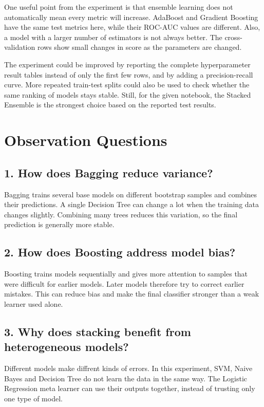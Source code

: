 \documentclass[12pt,a4paper]{article}
\begin{document}
One useful point from the experiment is that ensemble learning does not automatically mean every metric will increase. AdaBoost and Gradient Boosting have the same test metrics here, while their ROC-AUC values are different. Also, a model with a larger number of estimators is not always better. The cross-validation rows show small changes in score as the parameters are changed.

The experiment could be improved by reporting the complete hyperparameter result tables instead of only the first few rows, and by adding a precision-recall curve. More repeated train-test splits could also be used to check whether the same ranking of models stays stable. Still, for the given notebook, the Stacked Ensemble is the strongest choice based on the reported test results.

\section{Observation Questions}

\subsection*{1. How does Bagging reduce variance?}
Bagging trains several base models on different bootstrap samples and combines their predictions. A single Decision Tree can change a lot when the training data changes slightly. Combining many trees reduces this variation, so the final prediction is generally more stable.

\subsection*{2. How does Boosting address model bias?}
Boosting trains models sequentially and gives more attention to samples that were difficult for earlier models. Later models therefore try to correct earlier mistakes. This can reduce bias and make the final classifier stronger than a weak learner used alone.

\subsection*{3. Why does stacking benefit from heterogeneous models?}
Different models make diffrent kinds of errors. In this experiment, SVM, Naive Bayes and Decision Tree do not learn the data in the same way. The Logistic Regression meta learner can use their outputs together, instead of trusting only one type of model.
\end{document}
